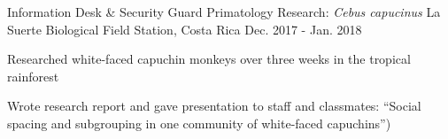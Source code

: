 

\begin{cventries}

  \cventry
    {Information Desk \& Security Guard} %
    {Primatology Research: \textit{Cebus capucinus}} %
    {La Suerte Biological Field Station, Costa Rica} %
    {Dec. 2017 - Jan. 2018} %
    {
      \begin{cvitems} %
        \item {Researched white-faced capuchin monkeys over three weeks in the tropical rainforest}
        \item {Wrote research report and gave presentation to staff and classmates: ``Social spacing and subgrouping in one community of white-faced capuchins'')}
      \end{cvitems}
    }

\end{cventries}